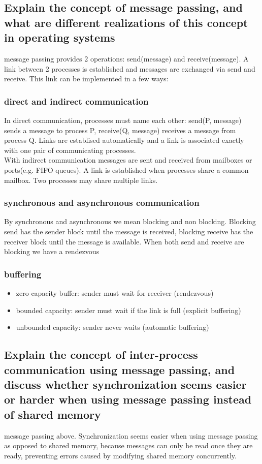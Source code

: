\documentclass{article}
\begin{document}
\subsection{Explain the concept of message passing, and what are different realizations of this concept in operating systems}
message passing provides 2 operations: send(message) and receive(message). A link between 2 processes is established and messages are exchanged via send and receive. This link can be implemented in a few ways:
\subsubsection{direct and indirect communication}
In direct communication, processes must name each other: send(P, message) sends a message to process P, receive(Q, message) receives a message from process Q. Links are establised automatically and a link is associated exactly with one pair of communicating processes.\\
With indirect communication messages are sent and received from mailboxes or ports(e.g. FIFO queues). A link is established when processes share a common mailbox. Two processes may share multiple links. 
\subsubsection{synchronous and asynchronous communication}
By synchronous and asynchronous we mean blocking and non blocking. Blocking send has the sender block until the message is received, blocking receive has the receiver block until the message is available. When both send and receive are blocking we have a rendezvous
\subsubsection{buffering}
\begin{itemize}
    \item zero capacity buffer: sender must wait for receiver (rendezvous)
    \item bounded capacity: sender must wait if the link is full (explicit buffering)
    \item unbounded capacity: sender never waits (automatic buffering)
\end{itemize}

\subsection{Explain the concept of inter-process communication using message passing, and discuss whether synchronization seems easier or harder when using message passing instead of shared memory}
message passing above. Synchronization seems easier when using message passing as opposed to shared memory, because messages can only be read once they are ready, preventing errors caused by modifying shared memory concurrently.
\end{document}
